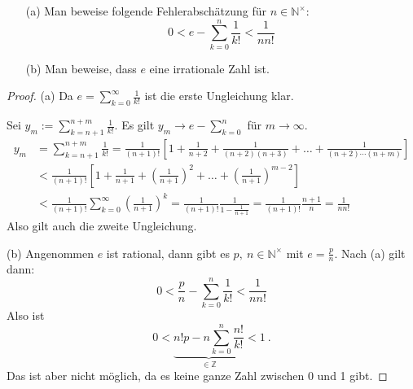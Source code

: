 \setcounter{aufgabe}{6}
\begin{aufgabe}
\begin{enumerate}
\item[(a)] Man beweise folgende Fehlerabschätzung für $n \in \mathbb N^\times$:
\[
0 < e - \sum_{k=0}^n \frac{1}{k!} < \frac{1}{n n!}
\]
\item[(b)] Man beweise, dass $e$ eine irrationale Zahl ist.
\end{enumerate}
\end{aufgabe}
\begin{proof}
\item[(a)] Da $e = \sum_{k=0}^\infty \frac{1}{k!}$ ist die erste Ungleichung klar.

Sei $y_m := \sum_{k = n+1}^{n + m} \frac{1}{k!}$. Es gilt 
$y_m \to e - \sum_{k=0}^n$ für $m \to \infty$.
\begin{align*}
y_m &= \sum_{k=n+1}^{n+m} \frac{1}{k!}
	= \frac{1}{(n+1)!} \left[ 1 + \frac{1}{n+2} + \frac{1}{(n+2)(n+3)} + \ldots
	+ \frac{1}{(n+2) \cdots (n+m)} \right] \\
	&< \frac{1}{(n+1)!} \left[ 1 + \frac{1}{n+1} + \left( \frac{1}{n+1} \right)^2 + \ldots
	+ \left( \frac{1}{n+1} \right)^{m-2} \right] \\
	&< \frac{1}{(n+1)!} \sum_{k=0}^\infty \left( \frac{1}{n+1} \right)^k
	= \frac{1}{(n+1)!} \frac{1}{1 - \frac{1}{n+1}} 
	= \frac{1}{(n+1)!} \frac{n+1}{n} = \frac{1}{n n!}
\end{align*}
Also gilt auch die zweite Ungleichung.

\item[(b)] Angenommen $e$ ist rational, dann gibt es $p, \ n \in \mathbb N^\times$
mit $e = \frac p n$. Nach (a) gilt dann:
\[
0 < \frac p n - \sum_{k=0}^n \frac{1}{k!} < \frac{1}{n n!}
\]
Also ist
\[
0 < \underbrace{ n! p - n \sum_{k=0}^n \frac{n!}{k!} }_{\in \mathbb Z} < 1 \ .
\]
Das ist aber nicht möglich, da es keine ganze Zahl zwischen 0 und 1 gibt.
\end{proof}

